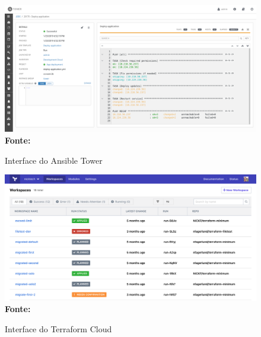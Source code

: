 \begin{figure}[H]
	\centering	
	\caption[\hspace{0.1cm} Interface do Ansible Tower]{ Interface do Ansible Tower}
	\vspace{-0.4cm}
	\includegraphics[width=1.0\textwidth]{artigo/figuras/RH-Ansible-Tower-job-details.png}
	 \vspace{-0.2cm}
	\\\textbf{\footnotesize Fonte: \cite{ansible_tower}}
	\label{fig:figura11}
\end{figure}
\vspace{-0.5cm}

\begin{figure}[H]
	\centering	
	\caption[\hspace{0.1cm} Interface do Terraform Cloud]{ Interface do Terraform Cloud}
	\vspace{-0.4cm}
	\includegraphics[width=1.0\textwidth]{artigo/figuras/terraform_cloud.png}
	 \vspace{-0.2cm}
	\\\textbf{\footnotesize Fonte: \cite{terraform_cloud}}
	\label{fig:figura11}
\end{figure}
\vspace{-0.5cm}

